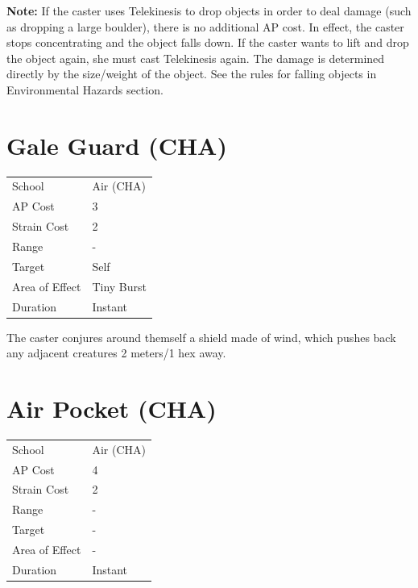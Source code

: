 \documentclass[11pt,a4paper,twocolumn]{book}
\begin{document}
	\textbf{Note:} If the caster uses Telekinesis to drop objects in order to deal damage (such as dropping a large boulder), there is no additional AP cost. In effect, the caster stops concentrating and the object falls down. If the caster wants to lift and drop the object again, she must cast Telekinesis again. The damage is determined directly by the size/weight of the object. See the rules for falling objects in Environmental Hazards section.
	
						\section*{Gale Guard (CHA)}
	{
		\begin{tabu} to 75mm{| X[l,4] | X[l,7] |}
			\hline
			School 			&  Air (CHA)			\\
			AP Cost	      	&  3					\\
			Strain Cost     &  2					\\
			Range     		&  -					\\
			Target      	&  Self					\\
			Area of Effect  &  Tiny Burst	 		\\
			Duration     	&  Instant				\\ \hline
		\end{tabu}
		
	}
	
	\medskip
	
	The caster conjures around themself a shield made of wind, which pushes back any adjacent creatures 2 meters/1 hex away. 
	
							\section*{Air Pocket (CHA)}
	{
		\begin{tabu} to 75mm{| X[l,4] | X[l,7] |}
			\hline
			School 			&  Air (CHA)			\\
			AP Cost	      	&  4					\\
			Strain Cost     &  2					\\
			Range     		&  -					\\
			Target      	&  -					\\
			Area of Effect  &  -	 				\\
			Duration     	&  Instant				\\ \hline
		\end{tabu}
		
	}
	
\end{document}
